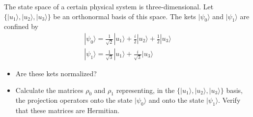 \documentclass[12pt,a4paper]{article}
\newenvironment{problem}[2][Problem]{\begin{trivlist}
\item[\hskip \labelsep {\bfseries #1}\hskip \labelsep {\bfseries #2.}]}{\end{trivlist}}
\begin{document}
\begin{problem}{3}
[C-T Exercise 2-3] The state space of a certain physical system is three-dimensional. Let $\{|u_1\rangle,|u_2\rangle,|u_3\rangle\}$ be an orthonormal basis of this space. The kets $|\psi_0\rangle$ and $|\psi_1\rangle$ are confined by
\begin{gather*}
|\psi_0\rangle=\frac{1}{\sqrt{2}}|u_1\rangle+\frac{i}{2}|u_2\rangle+\frac{1}{2}|u_3\rangle\\
|\psi_1\rangle=\frac{1}{\sqrt{3}}|u_1\rangle+\frac{i}{\sqrt{3}}|u_3\rangle
\end{gather*}
\begin{itemize}
\item[(a)] Are these kets normalized?
\item[(b)] Calculate the matrices $\rho_0$ and $\rho_1$ representing, in the $\{|u_1\rangle,|u_2\rangle,|u_3\rangle\}$ basis, the projection operators onto the state $|\psi_0\rangle$ and onto the state $|\psi_1\rangle$. Verify that these matrices are Hermitian.
\end{itemize}
\end{problem}
\end{document}
